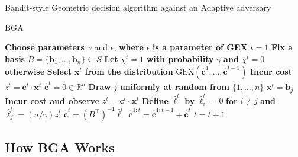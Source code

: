 \documentclass{beamer}
\begin{document}
\begin{frame}{Bandit-style Geometric decision algorithm against an Adaptive adversary}
    \begin{algorithm}[H]
        \scriptsize
        \caption{BGA}
        \begin{algorithmic}[1]
        \State \textbf{Choose parameters} $\gamma$ and $\epsilon$, \textbf{where} $\epsilon$ \textbf{is a parameter of GEX}
        \State $t = 1$
        \State \textbf{Fix a basis} $B = \{\mathbf{b}_1, \ldots, \mathbf{b}_n\} \subseteq S$
            \State \textbf{Let} $\chi^t = 1$ \textbf{with probability} $\gamma$ \textbf{and} $\chi^t = 0$ \textbf{otherwise}
                \State \textbf{Select} $\mathbf{x}^t$ \textbf{from the distribution} $\text{GEX}(\hat{\mathbf{c}}^1, \ldots, \hat{\mathbf{c}}^{t-1})$
                \State \textbf{Incur cost} $z^t = \mathbf{c}^t \cdot \mathbf{x}^t$
                \State $\hat{\mathbf{c}}^t = 0 \in \mathbb{R}^n$
            \Else
                \State \textbf{Draw} $j$ \textbf{uniformly at random from} $\{1, \ldots, n\}$
                \State $\mathbf{x}^t = \mathbf{b}_j$
                \State \textbf{Incur cost and observe} $z^t = \mathbf{c}^t \cdot \mathbf{x}^t$
                \State \textbf{Define} $\hat{\ell}^t$ \textbf{by} $\hat{\ell}^t_i = 0$ \textbf{for} $i \neq j$ \textbf{and} $\hat{\ell}^t_j = (n / \gamma) z^t$
                \State $\hat{\mathbf{c}}^t = (B^\top)^{-1} \hat{\ell}^t$
            \EndIf
            \State $\hat{\mathbf{c}}^{1:t} = \hat{\mathbf{c}}^{1:t-1} + \hat{\mathbf{c}}^t$
            \State $t = t + 1$
        \EndWhile
        \end{algorithmic}
        \end{algorithm}
\end{frame}        
\subsection{How BGA Works}
\end{document}
